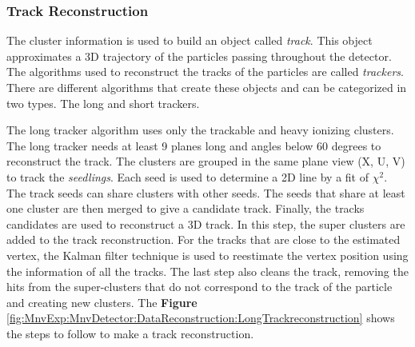 \subsubsection{Track Reconstruction}
\label{Cap:MnvExp:MnvDetector:DataReconstruction:TrackReconstruction}

The cluster information is used to build an object called \textit{track}. This object approximates a 3D trajectory of the particles passing throughout the detector. The algorithms used to reconstruct the tracks of the particles are called \textit{trackers}. There are different algorithms that create these objects and can be categorized in two types. The long and short trackers. 

The long tracker algorithm uses only the trackable and heavy ionizing clusters. The long tracker needs at least 9 planes long and angles below 60 degrees to reconstruct the track. The clusters are grouped in the same plane view (X, U, V) to track the \textit{ seedlings}. Each seed is used to determine a 2D line by a fit of $\chi^2$. The track seeds can share clusters with other seeds. The seeds that share at least one cluster are then merged to give a candidate track. Finally, the tracks candidates are used to reconstruct a 3D track. In this step, the super clusters are added to the track reconstruction. For the tracks that are close to the estimated vertex, the Kalman filter technique \cite{KalmanFilter} is used to reestimate the vertex position using the information of all the tracks. The last step also cleans the track, removing the hits from the super-clusters that do not correspond to the track of the particle and creating new clusters. The \textbf{Figure} \ref{fig:MnvExp:MnvDetector:DataReconstruction:LongTrackreconstruction} shows the steps to follow to make a track reconstruction. 

